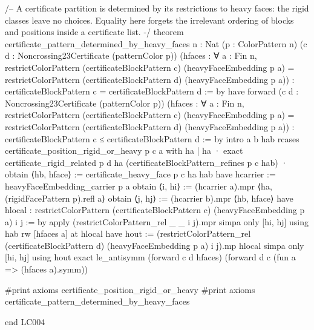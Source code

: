 \documentclass[11pt,reqno]{amsart}
\theoremstyle{definition}
\begin{document}
\begin{LeanCode}
/-- A certificate partition is determined by its restrictions to heavy
faces: the rigid classes leave no choices. Equality here forgets the
irrelevant ordering of blocks and positions inside a certificate list. -/
theorem certificate_pattern_determined_by_heavy_faces {n : Nat} (p : ColorPattern n)
    (c d : Noncrossing23Certificate (patternColor p))
    (hfaces : ∀ a : Fin n,
      restrictColorPattern (certificateBlockPattern c) (heavyFaceEmbedding p a) =
      restrictColorPattern (certificateBlockPattern d) (heavyFaceEmbedding p a)) :
    certificateBlockPattern c = certificateBlockPattern d := by
  have forward (c d : Noncrossing23Certificate (patternColor p))
      (hfaces : ∀ a : Fin n,
        restrictColorPattern (certificateBlockPattern c) (heavyFaceEmbedding p a) =
        restrictColorPattern (certificateBlockPattern d) (heavyFaceEmbedding p a)) :
      certificateBlockPattern c ≤ certificateBlockPattern d := by
    intro a b hab
    rcases certificate_position_rigid_or_heavy p c a with ha | ha
    · exact certificate_rigid_related p d ha (certificateBlockPattern_refines p c hab)
    · obtain ⟨hb, hface⟩ := certificate_heavy_face p c ha hab
      have hcarrier := heavyFaceEmbedding_carrier p a
      obtain ⟨i, hi⟩ := (hcarrier a).mpr ⟨ha, (rigidFacePattern p).refl a⟩
      obtain ⟨j, hj⟩ := (hcarrier b).mpr ⟨hb, hface⟩
      have hlocal : restrictColorPattern (certificateBlockPattern c)
          (heavyFaceEmbedding p a) i j := by
        apply (restrictColorPattern_rel _ _ i j).mpr
        simpa only [hi, hj] using hab
      rw [hfaces a] at hlocal
      have hout := (restrictColorPattern_rel (certificateBlockPattern d)
        (heavyFaceEmbedding p a) i j).mp hlocal
      simpa only [hi, hj] using hout
  exact le_antisymm (forward c d hfaces) (forward d c (fun a => (hfaces a).symm))

#print axioms certificate_position_rigid_or_heavy
#print axioms certificate_pattern_determined_by_heavy_faces

end LC004
\end{LeanCode}
\end{document}
